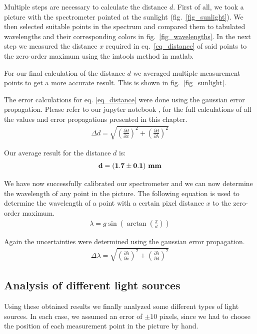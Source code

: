 Multiple steps are necessary to calculate the distance $d$.
First of all, we took a picture with the spectrometer pointed at the sunlight (fig.~\ref{fig_sunlight}). We then selected suitable 
points in the spectrum and compared them to tabulated wavelengths and their corresponding colors 
in fig.~\ref{fig_wavelengths}. In the next step we measured the distance $x$ required in eq.~\ref{eq_distance} of said points to the zero-order maximum
using the imtools method in matlab.

For our final calculation of the distance $d$ we averaged multiple measurement points to get a more
accurate result. This is shown in fig.~\ref{fig_sunlight}.

The error calculations for eq. \ref{eq_distance} were done using the gaussian error propagation.
Please refer to our jupyter notebook \cite{GitHub}, for the full calculations of all the values and 
error propagations presented in this chapter. 
\begin{align}
    \Delta d = \sqrt{\left(\frac{\partial d}{\partial x}\right)^2 + \left(\frac{\partial d}{\partial \lambda}\right)^2}
\end{align}

Our average result for the distance $d$ is:
\begin{align}
    \bf d = (1.7 \pm 0.1) ~\si{\bf\milli\meter} \label{res_d}
\end{align}

We have now successfully calibrated our spectrometer and we can now determine the wavelength
of any point in the picture.
The following equation is used to determine the wavelength of a point with a certain pixel 
distance $x$ to the zero-order maximum.
\begin{align}
    \lambda = g \sin\left(\arctan\left(\frac{x}{d}\right)\right) \label{eq_lambda}
\end{align}

Again the uncertainties were determined using the gaussian error propagation.
\begin{align}
    \Delta \lambda = \sqrt{\left(\frac{\partial \lambda}{\partial x}\right)^2 + \left(\frac{\partial \lambda}{\partial d}\right)^2}
\end{align}

\subsection{Analysis of different light sources}

Using these obtained results we finally analyzed some different types of light sources. In each case, we assumed 
an error of $\pm 10$ pixels, since we had to choose the position of each measurement point in the picture by hand.

